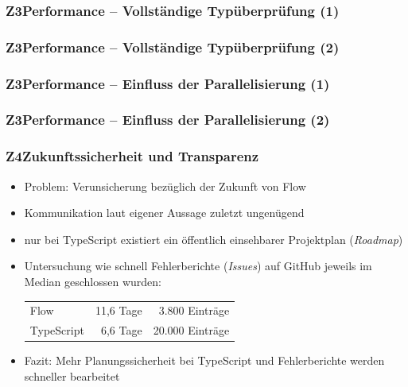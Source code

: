       \begin{frame}
        \frametitle{Z3\hspace{0.75em}Performance -- Vollständige Typüberprüfung (1)}
        
      \end{frame}

      \begin{frame}
        \frametitle{Z3\hspace{0.75em}Performance -- Vollständige Typüberprüfung (2)}
        
      \end{frame}

      \begin{frame}
        \frametitle{Z3\hspace{0.75em}Performance -- Einfluss der Parallelisierung (1)}
        
      \end{frame}

      \begin{frame}
        \frametitle{Z3\hspace{0.75em}Performance -- Einfluss der Parallelisierung (2)}
        
      \end{frame}

      \begin{frame}
        \frametitle{Z4\hspace{0.75em}Zukunftssicherheit und Transparenz}
        \begin{itemize}
          \item Problem: Verunsicherung bezüglich der Zukunft von Flow
          \item Kommunikation laut eigener Aussage zuletzt ungenügend~\autocite{FLOW:UPDATE_2019}
          \item nur bei TypeScript existiert ein öffentlich einsehbarer Projektplan (\textit{Roadmap})
          \item Untersuchung wie schnell Fehlerberichte (\textit{Issues}) auf GitHub jeweils im Median geschlossen wurden:\\
            \medskip
            {
              \footnotesize
              \begin{tabu}{@{}lrr@{}}
                \midrule
                Flow & 11,6 Tage & 3.800 Einträge \\
                TypeScript & 6,6 Tage & 20.000 Einträge \\
                \midrule
              \end{tabu}
            }
          \item Fazit: Mehr Planungssicherheit bei TypeScript und Fehlerberichte werden schneller bearbeitet
        \end{itemize}
      \end{frame}

